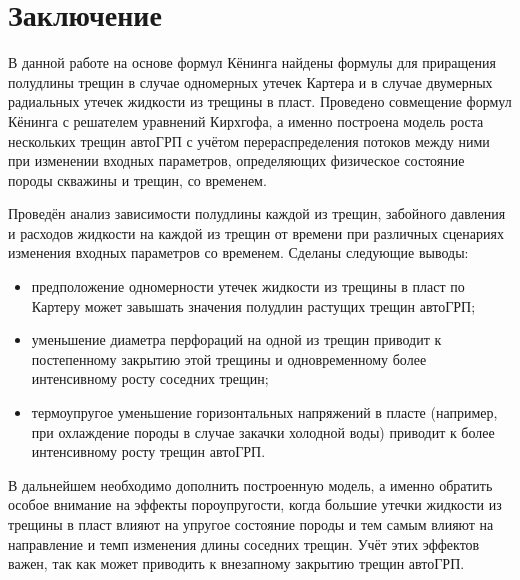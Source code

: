 \chapter*{Заключение} \label{ch-conclusion}

В данной работе на основе формул Кёнинга найдены формулы для приращения полудлины трещин в случае одномерных утечек Картера и в случае двумерных радиальных утечек жидкости из трещины в пласт.
Проведено совмещение формул Кёнинга с решателем уравнений Кирхгофа, а именно построена модель роста нескольких трещин автоГРП с учётом перераспределения потоков между ними при изменении входных параметров, определяющих физическое состояние породы скважины и трещин, со временем.

Проведён анализ зависимости полудлины каждой из трещин, забойного давления и расходов жидкости на каждой из трещин от времени при различных сценариях изменения входных параметров со временем. Сделаны следующие выводы:
\begin{itemize}
	\item предположение одномерности утечек жидкости из трещины в пласт по Картеру может завышать значения полудлин растущих трещин автоГРП;
	\item уменьшение диаметра перфораций на одной из трещин приводит к постепенному закрытию этой трещины и одновременному более интенсивному росту соседних трещин;
	\item термоупругое уменьшение горизонтальных напряжений в пласте (например, при охлаждение породы в случае закачки холодной воды) приводит к более интенсивному росту трещин автоГРП.
\end{itemize}

В дальнейшем необходимо дополнить построенную модель, а именно обратить особое внимание на эффекты пороупругости, когда большие утечки жидкости из трещины в пласт влияют на упругое состояние породы и тем самым влияют на направление и темп изменения длины соседних трещин.
Учёт этих эффектов важен, так как может приводить к внезапному закрытию трещин автоГРП.
